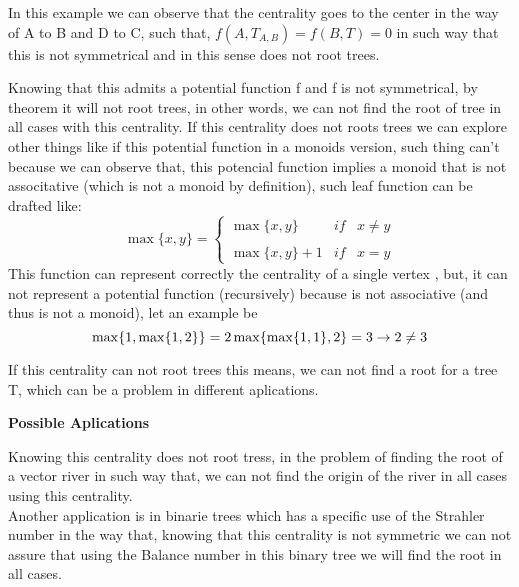 In this example we can observe that the centrality goes to the center in the way of A to B and D to C, such that, $f(A,T_{A,B}) =  f(B,T) = 0$ in such way that this is not symmetrical and in this sense does not root trees.

Knowing that this admits a potential function f and f is not symmetrical, by theorem it will not root trees, in other words, we can not find the root of tree in all cases with this centrality. If this centrality does not roots trees we can explore other things like if this potential function in a monoids version, such thing can't because we can observe that, this potencial function implies a monoid that is not associtative (which is not a monoid by definition), such leaf function can be drafted like:
\begin{equation}
    \max\{ x,y \}= \left\{ \begin{array}{lcc}
              \max\{x,y \} &   if  & x \neq y \\
             \\ \max\{ x,y \} + 1 & if  & x = y 
             \end{array}
   \right.
\end{equation}
This function can represent correctly the centrality of a single vertex , but, it can not represent a potential function (recursively) because is not associative (and thus is not a monoid), let an example be
\begin{equation}
    \max\{ 1,\max\{ 1,2 \} \} = 2 \\
    \vspace{0.5cm}
    \max\{ \max\{ 1,1 \},2 \}  = 3 \\
    \vspace{0.5cm}
    \rightarrow 2 \neq 3
\end{equation}

If this centrality can not root trees this means, we can not find a root for a tree T, which can be a problem in different aplications.

\vspace{0.5cm}

\textbf{Possible Aplications}

Knowing this centrality does not root tress, in the problem of finding the root of a vector river in such way that, we can not find the origin of the river in all cases using this centrality.\\


Another application is in binarie trees which has a specific use of the Strahler number in the way that, knowing that this centrality is not symmetric we can not assure that using the Balance number in this binary tree we will find the root in all cases.

